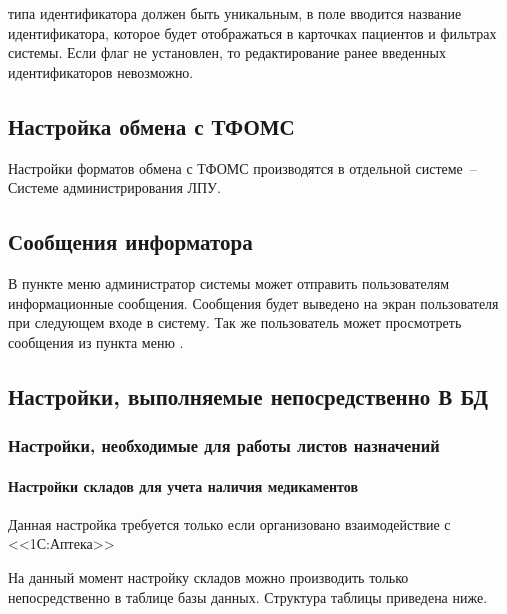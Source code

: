  типа идентификатора должен быть уникальным, в поле  вводится название идентификатора, которое будет отображаться в карточках пациентов и фильтрах системы. Если флаг  не установлен, то редактирование ранее введенных идентификаторов невозможно.

\subsection{Настройка обмена с ТФОМС}

Настройки форматов обмена с ТФОМС производятся в отдельной системе~– Системе администрирования ЛПУ.

\subsection{Сообщения информатора}

В пункте меню  администратор системы может отправить  пользователям информационные сообщения. Сообщения будет выведено на экран пользователя при следующем входе в систему. Так же пользователь может просмотреть сообщения из пункта меню .

\subsection{Настройки, выполняемые непосредственно В БД}

\subsubsection{Настройки, необходимые для работы листов назначений} 

\paragraph{Настройки складов для учета наличия медикаментов}

\begin{vnim}
 Данная настройка требуется только если организовано взаимо\-дей\-ствие с <<1С:Аптека>>
\end{vnim}
 
На данный момент настройку складов можно производить только непосредственно в таблице  базы данных. Структура таблицы приведена ниже.

